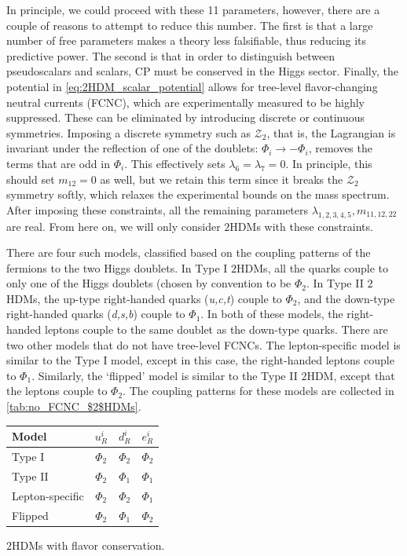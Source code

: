 In principle, we could proceed with these 11 parameters, however, there are a couple of reasons to attempt to reduce this number. The first is that a large number of free parameters makes a theory less falsifiable, thus reducing its predictive power. The second is that in order to distinguish between pseudoscalars and scalars, CP must be conserved in the Higgs sector. Finally, the potential in \eqref{eq:2HDM_scalar_potential} allows for tree-level flavor-changing neutral currents (FCNC), which are experimentally measured to be highly suppressed. These can be eliminated by introducing discrete or continuous symmetries. Imposing a discrete symmetry such as $\mathcal{Z}_2$, that is, the Lagrangian is invariant under the reflection of one of the doublets: $\Phi_i\rightarrow-\Phi_i$, removes the terms that are odd in $\Phi_i$. This effectively sets $\lambda_6=\lambda_7 = 0$. In principle, this should set $m_{12} = 0$ as well, but we retain this term since it breaks the $\mathcal{Z}_2$ symmetry softly, which relaxes the experimental bounds on the mass spectrum.
After imposing these constraints, all the remaining parameters $\lambda_{1,2,3,4,5}, m_{11,12,22}$ are real. From here on, we will only consider $2$HDMs with these constraints. 

There are four such models, classified based on the coupling patterns of the fermions to the two Higgs doublets. In Type I $2$HDMs, all the quarks couple to only one of the Higgs doublets (chosen by convention to be $\Phi_2$. In Type II $2$HDMs, the up-type right-handed quarks (\emph{u,c,t}) couple to $\Phi_2$, and the down-type right-handed quarks (\emph{d,s,b}) couple to $\Phi_1$. In both of these models, the right-handed leptons couple to the same doublet as the down-type quarks. There are two other models that do not have tree-level FCNCs. The lepton-specific model is similar to the Type I model, except in this case, the right-handed leptons couple to $\Phi_1$. Similarly, the `flipped' model is similar to the Type II $2$HDM, except that the leptons couple to $\Phi_2$. The coupling patterns for these models are collected in \autoref{tab:no_FCNC_$2$HDMs}.

\begin{margintable}
\small{
  \begin{tabular}{lccc}
	\toprule
    Model & $u_R^i$ & $d_R^i$  & $e_R^i$\\
    \midrule
    Type I          & $\Phi_2$ & $\Phi_2$ & $\Phi_2$\\
    Type II         & $\Phi_2$ & $\Phi_1$ & $\Phi_1$\\
    Lepton-specific & $\Phi_2$ & $\Phi_2$ & $\Phi_1$\\
    Flipped         & $\Phi_2$ & $\Phi_1$ & $\Phi_2$\\
    \bottomrule
  \end{tabular}}
  \caption{$2$HDMs with flavor conservation.}
  \label{tab:no_FCNC_$2$HDMs}
\end{margintable}

